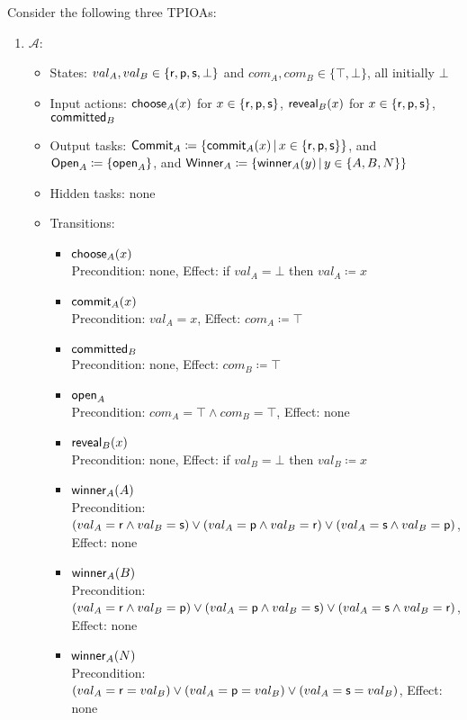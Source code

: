 \documentclass[10pt]{article}
\begin{document}
\begin{example}[$\RPSIdeal$]
Consider the following three TPIOAs:
\begin{enumerate}

\item $\mathcal{A}$:
\begin{itemize}
\item States: $val_A, val_B \in \{\mathsf{r},\mathsf{p},\mathsf{s},\bot\}$ and $com_A, com_B \in \{\top,\bot\}$, all initially $\bot$
\item Input actions: $\mathsf{choose}_A(x)$ for $x \in \{\mathsf{r},\mathsf{p},\mathsf{s}\}$, $\mathsf{reveal}_B(x)$ for $x \in \{\mathsf{r},\mathsf{p},\mathsf{s}\}$, $\mathsf{committed}_B$
\item Output tasks: $\mathsf{Commit}_A \coloneqq \{\mathsf{commit}_A(x) \, | \, x \in \{\mathsf{r},\mathsf{p},\mathsf{s}\}\}$, and $\mathsf{Open}_A \coloneqq \{\mathsf{open}_A\}$, and $\mathsf{Winner}_A \coloneqq \{\mathsf{winner}_A(y) \, | \, y \in \{A,B,N\}\}$ 
\item Hidden tasks: none
\item Transitions:
\begin{itemize}
\item $\mathsf{choose}_A(x)$ \\
Precondition: none, Effect: if $val_A = \bot$ then $val_A \coloneqq x$
\item $\mathsf{commit}_A(x)$ \\
Precondition: $val_A = x$, Effect: $com_A \coloneqq \top$
\item $\mathsf{committed}_B$ \\
Precondition: none, Effect: $com_B \coloneqq \top$
\item $\mathsf{open}_A$\\
Precondition: $com_A = \top \wedge com_B = \top$, Effect: none
\item $\mathsf{reveal}_B(x)$\\
Precondition: none, Effect: if $val_B = \bot$ then $val_B \coloneqq x$
\item $\mathsf{winner}_A(A)$ \\
Precondition: $(val_A = \mathsf{r} \wedge val_B = \mathsf{s}) \vee (val_A = \mathsf{p} \wedge val_B = \mathsf{r}) \vee (val_A = \mathsf{s} \wedge val_B = \mathsf{p})$, Effect: none
\item $\mathsf{winner}_A(B)$ \\
Precondition: $(val_A = \mathsf{r} \wedge val_B = \mathsf{p}) \vee (val_A = \mathsf{p} \wedge val_B = \mathsf{s}) \vee (val_A = \mathsf{s} \wedge val_B = \mathsf{r})$, Effect: none
\item $\mathsf{winner}_A(N)$ \\
Precondition: $(val_A = \mathsf{r} = val_B) \vee (val_A = \mathsf{p} = val_B) \vee (val_A = \mathsf{s} = val_B)$, Effect: none
\end{itemize}
\end{itemize}


\end{enumerate}
\end{example}
\end{document}
